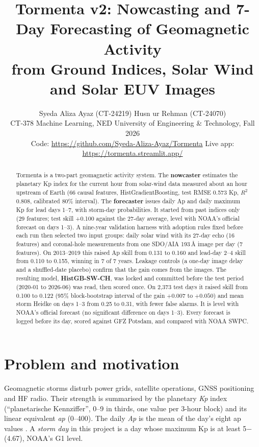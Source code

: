 \documentclass[11pt,a4paper]{article}
\title{\vspace{-1.2em}\textbf{Tormenta v2: Nowcasting and 7-Day Forecasting of Geomagnetic Activity\\
from Ground Indices, Solar Wind and Solar EUV Images}\vspace{-0.4em}}
\author{Syeda Aliza Ayaz (CT-24219) \quad Husn ur Rehman (CT-24070)\\[1pt]
\small CT-378 Machine Learning, NED University of Engineering \& Technology, Fall 2026\\[1pt]
\small Code: \url{https://github.com/Syeda-Aliza-Ayaz/Tormenta} \quad Live app: \url{https://tormenta.streamlit.app/}}
\date{\vspace{-1.6em}}
\begin{document}
\maketitle

\begin{abstract}
\noindent Tormenta is a two-part geomagnetic activity system. The \textbf{nowcaster} estimates the planetary Kp
index for the current hour from solar-wind data measured about an hour upstream of Earth (66 causal features,
HistGradientBoosting, test RMSE 0.573 Kp, $R^2$ 0.808, calibrated 80\% interval). The \textbf{forecaster} issues
daily Ap and daily maximum Kp for lead days 1--7, with storm-day probabilities. It started from past indices only
(29 features; test skill +0.100 against the 27-day average, level with NOAA's official forecast on days 1--3). A
nine-year validation harness with adoption rules fixed before each run then selected two input groups: daily solar
wind with its 27-day echo (16 features) and coronal-hole measurements from one SDO/AIA 193\,\AA{} image per day
(7 features). On 2013--2019 this raised Ap skill from 0.131 to 0.160 and lead-day 2--4 skill from 0.110 to 0.155,
winning in 7 of 7 years. Leakage controls (a one-day image delay and a shuffled-date placebo) confirm that the gain
comes from the images. The resulting model, \textbf{HistGB-SW-CH}, was locked and committed before the test period
(2020-01 to 2026-06) was read, then scored once. On 2{,}373 test days it raised skill from 0.100 to 0.122 (95\%
block-bootstrap interval of the gain $+0.007$ to $+0.050$) and mean storm Heidke on days 1--3 from 0.25 to 0.31, with
fewer false alarms. It is level with NOAA's official forecast (no significant difference on days 1--3). Every forecast is logged before its
day, scored against GFZ Potsdam, and compared with NOAA SWPC.
\end{abstract}

\tableofcontents
\clearpage

\section{Problem and motivation}
Geomagnetic storms disturb power grids, satellite operations, GNSS positioning and HF radio. Their strength is
summarised by the planetary \emph{Kp} index (``planetarische Kennziffer'', 0--9 in thirds, one value per 3-hour
block) and its linear equivalent \emph{ap} (0--400). The daily \emph{Ap} is the mean of the day's eight ap values
\cite{matzka2021}. A \emph{storm day} in this project is a day whose maximum Kp is at least 5$-$ (4.67), NOAA's G1
level.
\end{document}
